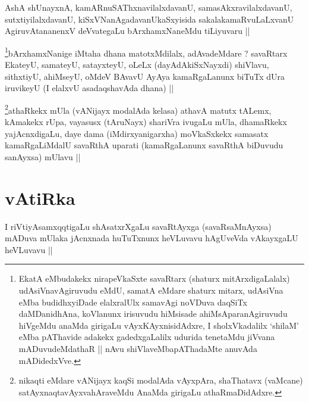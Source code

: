 \begin{artha}
AshA shUnayxnA, kamARnuSAThxnavilalxdavanU, samasAkxravilalxdavanU,
sutxtiyilalxdavanU, kiSxVNanAgadavanUkaSxyisida sakalakamaRvuLaLxvanU
AgiruvAtananenxV deVvategaLu bArxhamxNaneMdu tiLiyuvaru ||
\end{artha}


\begin{artha}
\footnote{EkatA eMbudakekx nirapeVkaSxte savaRtarx (shaturx
  mitArxdigaLalalx) udAsiVnavAgiruvudu eMdU, samatA eMdare shaturx
  mitarx, udAsiVna eMba budidhxyiDade elalxralUlx samavAgi noVDuva
  daqSiTx daMDanidhAna, koVlanunx irisuvudu hiMsisade
  ahiMsAparanAgiruvudu hiVgeMdu anaMda girigaLu vAyxKAyxnisidAdxre, I
  sholxVkadalilx `shilaM' eMba pAThavide adakekx gadedxgaLalilx
  udurida tenetaMdu jiVvana mADuvudeMdathaR || nAvu
  shiVlaveMbapAThadaMte anuvAda mADidedxVve.}bArxhamxNanige iMtaha dhana matotxMdilalx, adAvadeMdare ?
savaRtarx EkateyU, samateyU, satayxteyU, oLeLx (dayAdAkiSxNayxdi)
shiVlavu, sithxtiyU, ahiMseyU, oMdeV BAvavU AyAya kamaRgaLanunx biTuTx
dUra iruvikeyU  (I elalxvU asadaqshavAda dhana) ||
\end{artha}


\begin{artha}
\footnote{nikaqti eMdare vANijayx kaqSi modalAda vAyxpAra, shaThatavx
  (vaMcane) satAyxnaqtavAyxvahAraveMdu AnaMda girigaLu athaRmaDidAdxre.}athaRkekx mUla (vANijayx modalAda kelasa) athavA matutx
tALemx, kAmakekx rUpa, vayasusx (tAruNayx) shariVra ivugaLu mUla,
dhamaRkekx yajAcnxdigaLu, daye dama (iMdirxyanigarxha) moVkaSxkekx
samasatx kamaRgaLiMdalU savaRthA uparati (kamaRgaLanunx savaRthA
biDuvudu sanAyxsa) mUlavu ||
\end{artha}

\section*{vAtiRka}

\begin{artha}
I riVtiyAsamxqqtigaLu shAsatxrXgaLu savaRtAyxga (savaRsaMnAyxsa)
mADuva mUlaka jAcnxnada huTuTxnunx heVLuvavu hAgUveVda vAkayxgaLU
heVLuvavu ||
\end{artha}


